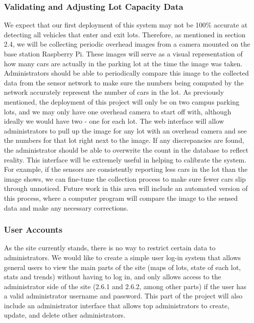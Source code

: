 \documentclass[11pt, oneside, fullpage, doublespace]{article}
\begin{document}
\subsubsection{Validating and Adjusting Lot Capacity Data}
We expect that our first deployment of this system may not be 100\% accurate at detecting all vehicles that enter and exit lots. Therefore, as mentioned in section 2.4, we will be collecting periodic overhead images from a camera mounted on the base station Raspberry Pi. These images will serve as a visual representation of how many cars are actually in the parking lot at the time the image was taken. Administrators should be able to periodically compare this image to the collected data from the sensor network to make sure the numbers being computed by the network accurately represent the number of cars in the lot. As previously mentioned, the deployment of this project will only be on two campus parking lots, and we may only have one overhead camera to start off with, although ideally we would have two - one for each lot. The web interface will allow administrators to pull up the image for any lot with an overhead camera and see the numbers for that lot right next to the image. If any discrepancies are found, the administrator should be able to overwrite the count in the database to reflect reality. This interface will be extremely useful in helping to calibrate the system. For example, if the sensors are consistently reporting less cars in the lot than the image shows, we can fine-tune the collection process to make sure fewer cars slip through unnoticed. Future work in this area will include an automated version of this process, where a computer program will compare the image to the sensed data and make any necessary corrections.

\subsubsection{User Accounts}
As the site currently stands, there is no way to restrict certain data to administrators. We would like to create a simple user log-in system that allows general users to view the main parts of the site (maps of lots, state of each lot, stats and trends) without having to log in, and only allows access to the administrator side of the site (2.6.1 and 2.6.2, among other parts) if the user has a valid administrator username and password. This part of the project will also include an administrator interface that allows top administrators to create, update, and delete other administrators.
\end{document}
